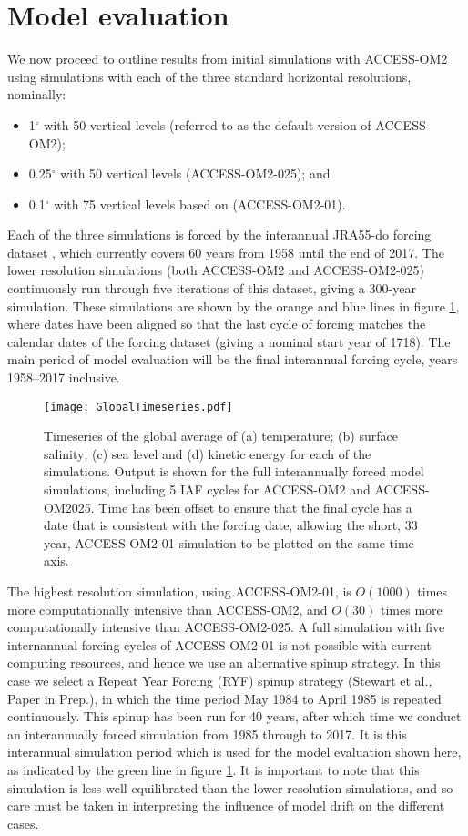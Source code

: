 \documentclass[gmd, manuscript]{copernicus}
\begin{document}
\section{Model evaluation}
We now proceed to outline results from initial simulations with ACCESS-OM2 using simulations with each of the three standard horizontal resolutions, nominally: 
\begin{itemize}
\item 1$^\circ$ with 50 vertical levels (referred to as the default version of ACCESS-OM2); 
\item 0.25$^\circ$ with 50 vertical levels (ACCESS-OM2-025); and
\item 0.1$^\circ$ with 75 vertical levels based on \citet{Stewart2017a} (ACCESS-OM2-01).
\end{itemize}
Each of the three simulations is forced by the interannual JRA55-do forcing dataset  \citep{TsujinoETAL2018a}, which  currently covers 60 years from 1958 until the end of 2017.
The  lower resolution simulations (both ACCESS-OM2 and ACCESS-OM2-025) continuously run through five iterations of this dataset, giving a 300-year simulation.
These simulations are shown by the orange and blue lines in figure \ref{fig:timeseries}, where dates have been aligned so that the last cycle of forcing matches the calendar dates of the forcing dataset (giving a nominal start year of 1718).
The main period of model evaluation will be the final interannual forcing cycle, years 1958--2017 inclusive.

\begin{figure}[t]
\texttt{[image: GlobalTimeseries.pdf]}
\caption{Timeseries of the global average of (a) temperature; (b) surface salinity; (c) sea level and (d) kinetic energy for each of the simulations. 
Output is shown for the full interannually forced model simulations, including 5 IAF cycles for ACCESS-OM2 and ACCESS-OM2025.
Time has been offset to ensure that the final cycle has a date that is consistent with the forcing date, allowing the short, 33 year, ACCESS-OM2-01 simulation to be plotted on the same time axis.\label{fig:timeseries}}
\end{figure}

The highest resolution simulation, using ACCESS-OM2-01, is $O(1000)$ times more computationally intensive than ACCESS-OM2, and $O(30)$ times more computationally intensive than ACCESS-OM2-025.
A full simulation with five internannual forcing cycles of ACCESS-OM2-01 is not possible with current computing resources, and hence we use an alternative spinup strategy. 
In this case we select a Repeat Year Forcing (RYF) spinup strategy (Stewart et al., Paper in Prep.), in which the time period May 1984 to April 1985 is repeated continuously.
This spinup has been run for 40 years, after which time we conduct an interannually forced simulation from 1985 through to 2017. 
It is this interannual simulation period which is used for the model evaluation shown here, as indicated by the green line in figure \ref{fig:timeseries}.
It is important to note that this simulation is less well equilibrated than the lower resolution simulations, and so care must be taken in interpreting the influence of model drift on the different cases.
\end{document}
